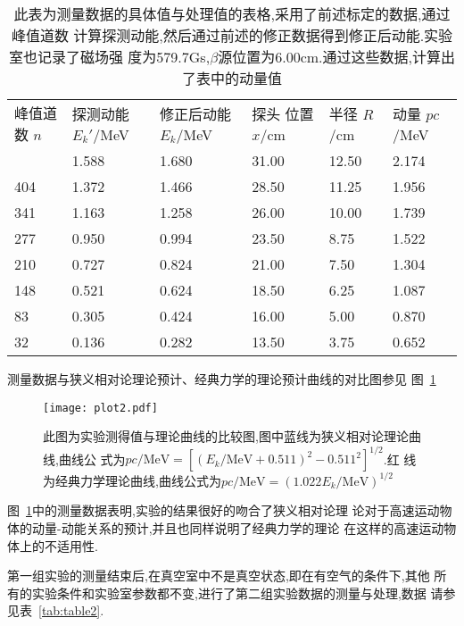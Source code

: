 \documentclass[aps,pre,12pt,preprint,onecolumn,showpacs,showkeys]{revtex4-1}
\begin{document}
\begin{table}[htbp]
  \caption{\label{tab:table1}%
此表为测量数据的具体值与处理值的表格,采用了前述标定的数据,通过峰值道数
计算探测动能,然后通过前述的修正数据得到修正后动能.实验室也记录了磁场强
度为579.7Gs,$\beta$源位置为6.00cm.通过这些数据,计算出了表中的动量值}
\begin{ruledtabular}
  \begin{tabular}{llllll}
     峰值道数 $n$ & 探测动能 $E_k'$/MeV & 修正后动能  $E_k$/MeV & 探头
     位置 $x$/cm & 半径 $R$/cm & 动量 $pc$/MeV\\
     \colrule
     469.0 & 1.588 & 1.680 & 31.00 & 12.50 & 2.174 \\
404 & 1.372 & 1.466 & 28.50 & 11.25 & 1.956 \\
341 & 1.163 & 1.258 & 26.00 & 10.00 & 1.739 \\
277 & 0.950 & 0.994 & 23.50 & 8.75 & 1.522 \\
210 & 0.727 & 0.824 & 21.00 & 7.50 & 1.304 \\
148 & 0.521 & 0.624 & 18.50 & 6.25 & 1.087 \\
83 & 0.305 & 0.424 & 16.00 & 5.00 & 0.870 \\
32 & 0.136 & 0.282 & 13.50 & 3.75 & 0.652 
\end{tabular}
\end{ruledtabular}
\end{table}


测量数据与狭义相对论理论预计、经典力学的理论预计曲线的对比图参见
图~\ref{fig:plot2}

\begin{figure}[htbp]
  \centering
\texttt{[image: plot2.pdf]}
\caption{\label{fig:plot2}%
此图为实验测得值与理论曲线的比较图,图中蓝线为狭义相对论理论曲线,曲线公
式为$pc/\text{MeV} = [(E_k/\text{MeV} + 0.511)^2 - 0.511^2]^{1/2}$.红
线为经典力学理论曲线,曲线公式为$pc/\text{MeV} = (1.022E_k/\text{MeV})^{1/2}$}
\end{figure}

图~\ref{fig:plot2}中的测量数据表明,实验的结果很好的吻合了狭义相对论理
论对于高速运动物体的动量-动能关系的预计,并且也同样说明了经典力学的理论
在这样的高速运动物体上的不适用性.


第一组实验的测量结束后,在真空室中不是真空状态,即在有空气的条件下,其他
所有的实验条件和实验室参数都不变,进行了第二组实验数据的测量与处理,数据
请参见表~\ref{tab:table2}.
\end{document}

